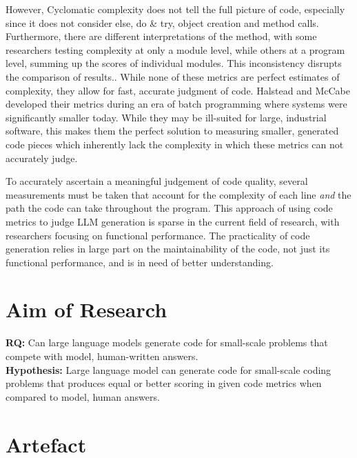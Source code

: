 \documentclass[manuscript,screen,review,sigconf]{acmart}
\begin{document}
However, Cyclomatic complexity does not tell the full picture of code, especially since it does not consider else, do \& try, object creation and method calls. Furthermore, there are different interpretations of the method, with some researchers testing complexity at only a module level, while others at a program level, summing up the scores of individual modules. This inconsistency disrupts the comparison of results.\cite{McCabeCritique, NoviceCodeWriting}.  While none of these metrics are perfect estimates of complexity, they allow for fast, accurate judgment of code. Halstead and McCabe developed their metrics during an era of batch programming where systems were significantly smaller today. While they may be ill-suited for large, industrial software, this makes them the perfect solution to measuring smaller, generated code pieces which inherently lack the complexity in which these metrics can not accurately judge\cite{metricCritique}.

To accurately ascertain a meaningful judgement of code quality, several measurements must be taken that account for the complexity of each line \textit{and} the path the code can take throughout the program. This approach of using code metrics to judge LLM generation is sparse in the current field of research\cite{CopilotPairProgrammer, CopilotSuggestionsEval}, with researchers focusing on functional performance. The practicality of code generation relies in large part on the maintainability of the code, not just its functional performance, and is in need of better understanding.

\section{Aim of Research}
\textbf{RQ:} Can large language models generate code for small-scale problems that compete with model, human-written answers.\\
\textbf{Hypothesis:} Large language model can generate code for small-scale coding problems that produces equal or better scoring in given code metrics when compared to model, human answers.

\section{Artefact}

\end{document}
